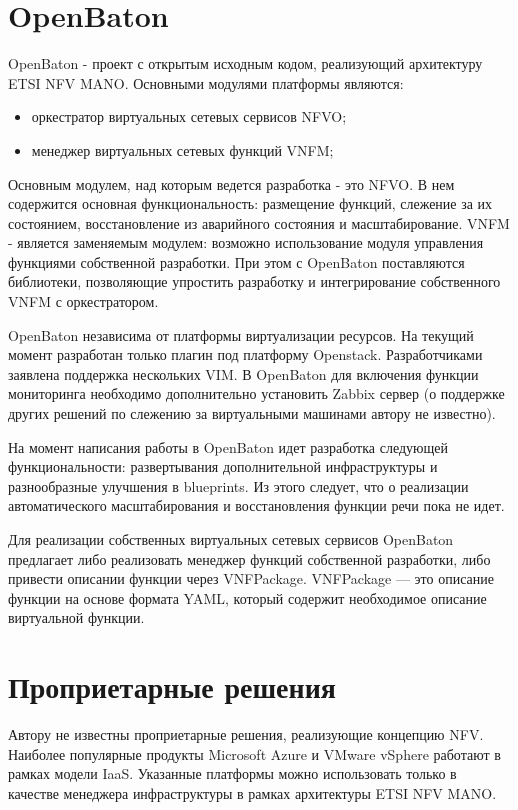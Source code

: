 \documentclass[oneside,final,14pt,a4paper]{extreport}
\begin{document}
\section{OpenBaton}
OpenBaton - проект с открытым исходным кодом, реализующий архитектуру ETSI NFV MANO. Основными модулями платформы являются:
\begin{itemize}
	\item оркестратор виртуальных сетевых сервисов NFVO;
	\item менеджер виртуальных сетевых функций VNFM;
\end{itemize}

Основным модулем, над которым ведется разработка - это NFVO. В нем содержится основная функциональность: размещение функций, слежение за их состоянием, восстановление из аварийного состояния и масштабирование. VNFM - является заменяемым модулем: возможно использование модуля управления функциями собственной разработки. При этом с OpenBaton поставляются библиотеки, позволяющие упростить разработку и интегрирование собственного VNFM с оркестратором.

OpenBaton независима от платформы виртуализации ресурсов. На текущий момент разработан только плагин под платформу Openstack. Разработчиками заявлена поддержка нескольких VIM. В OpenBaton для включения функции мониторинга необходимо дополнительно установить Zabbix сервер (о поддержке других решений по слежению за виртуальными машинами автору не известно).

На момент написания работы в OpenBaton идет разработка следующей функциональности: развертывания дополнительной инфраструктуры и разнообразные улучшения в blueprints. Из этого следует, что о реализации автоматического масштабирования и восстановления функции речи пока не идет.

Для реализации собственных виртуальных сетевых сервисов OpenBaton предлагает либо реализовать менеджер функций собственной разработки, либо привести описании функции через VNFPackage. VNFPackage --- это описание функции на основе формата YAML, который содержит необходимое описание виртуальной функции.\cite{bib:openbaton-official}


\section{Проприетарные решения}
Автору не известны проприетарные решения, реализующие концепцию NFV. Наиболее популярные продукты Microsoft Azure и VMware vSphere работают в рамках модели IaaS. Указанные платформы можно использовать только в качестве менеджера инфраструктуры в рамках архитектуры ETSI NFV MANO.
\end{document}
